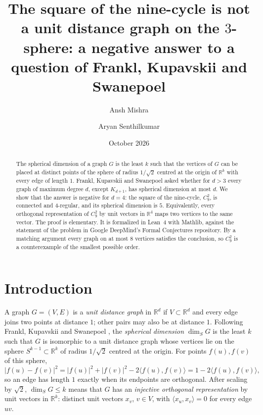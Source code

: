 \documentclass[11pt]{amsart}
\theoremstyle{definition}
\theoremstyle{remark}
\newcommand{\R}{\mathbb{R}}
\newcommand{\ip}[2]{\langle #1,#2\rangle}
\begin{document}
\title[The square of the nine-cycle on the 3-sphere]{The square of the nine-cycle is not a unit distance graph on the $3$-sphere: a negative answer to a question of Frankl, Kupavskii and Swanepoel}

\author{Ansh Mishra}
\author{Aryan Senthilkumar}

\date{October 2026}

\begin{abstract}
The spherical dimension of a graph $G$ is the least $k$ such that the vertices of $G$ can be placed at distinct points of the sphere of radius $1/\sqrt2$ centred at the origin of $\R^k$ with every edge of length $1$.
Frankl, Kupavskii and Swanepoel asked whether for $d>3$ every graph of maximum degree $d$, except $K_{d+1}$, has spherical dimension at most $d$.
We show that the answer is negative for $d=4$: the square of the nine-cycle, $C_9^2$, is connected and $4$-regular, and its spherical dimension is $5$.
Equivalently, every orthogonal representation of $C_9^2$ by unit vectors in $\R^4$ maps two vertices to the same vector.
The proof is elementary.
It is formalized in Lean~4 with Mathlib, against the statement of the problem in Google DeepMind's Formal Conjectures repository.
By a matching argument every graph on at most $8$ vertices satisfies the conclusion, so $C_9^2$ is a counterexample of the smallest possible order.
\end{abstract}

\maketitle

\section{Introduction}

A graph $G=(V,E)$ is a \emph{unit distance graph} in $\R^d$ if $V\subset\R^d$ and every edge joins two points at distance $1$; other pairs may also be at distance $1$.
Following Frankl, Kupavskii and Swanepoel \cite{FKS}, the \emph{spherical dimension} $\dim_S G$ is the least $k$ such that $G$ is isomorphic to a unit distance graph whose vertices lie on the sphere $S^{k-1}\subset\R^k$ of radius $1/\sqrt2$ centred at the origin.
For points $f(u),f(v)$ of this sphere,
\[
|f(u)-f(v)|^2=|f(u)|^2+|f(v)|^2-2\ip{f(u)}{f(v)}=1-2\ip{f(u)}{f(v)},
\]
so an edge has length $1$ exactly when its endpoints are orthogonal.
After scaling by $\sqrt2$, $\dim_S G\le k$ means that $G$ has an \emph{injective orthogonal representation} by unit vectors in $\R^k$: distinct unit vectors $x_v$, $v\in V$, with $\ip{x_u}{x_v}=0$ for every edge $uv$.
\end{document}
